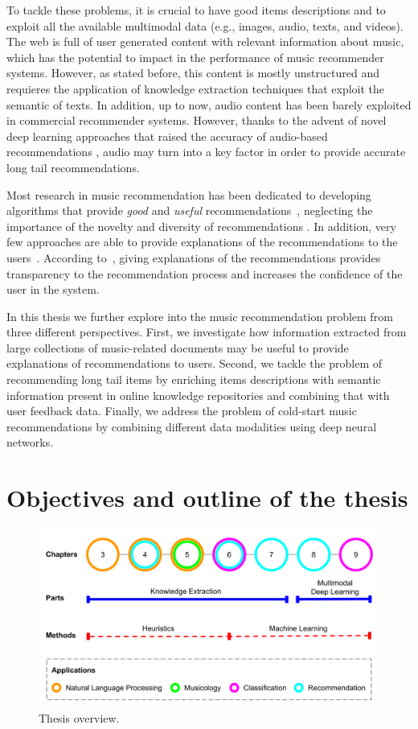 To tackle these problems, it is crucial to have good items descriptions and to exploit all the available multimodal data (e.g., images, audio, texts, and videos).
The web is full of user generated content with relevant information about music, which has the potential to impact in the performance of music recommender systems. However, as stated before, this content is mostly unstructured and requieres the application of knowledge extraction techniques that exploit the semantic of texts.
In addition, up to now, audio content has been barely exploited in commercial recommender systems. However, thanks to the advent of novel deep learning approaches that raised the accuracy of audio-based recommendations \citep{Oord2013}, audio may turn into a key factor in order to provide accurate long tail recommendations.

Most research in music recommendation has been dedicated to developing algorithms that provide \textit{good} and \textit{useful} recommendations~\citep{oscarBook}, neglecting the importance of the novelty and diversity of recommendations \citep{adomavicius2012improving,Bellogin2010}. In addition, very few approaches are able to provide explanations of the recommendations to the users~\citep{Passant2008, Passant2010}. According to~\cite{celma2008new}, giving explanations of the recommendations provides transparency to the recommendation process and increases the confidence of the user in the system.

In this thesis we further explore into the music recommendation problem from three different perspectives. First, we investigate how information extracted from large collections of music-related documents may be useful to provide explanations of recommendations to users. Second, we tackle the problem of recommending long tail items by enriching items descriptions with semantic information present in online knowledge repositories and combining that with user feedback data. Finally, we address the problem of cold-start music recommendations by combining different data modalities using deep neural networks.


\section{Objectives and outline of the thesis}
\label{sec:intro:objectives}

\begin{figure}
	\centering
	\includegraphics[width=\textwidth]{ch01_introduction_pics/Thesis_schema.png}
	\caption{Thesis overview.\label{fig:intro:chapters}}
\end{figure}

